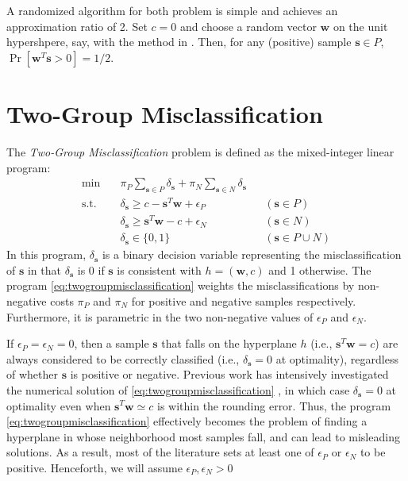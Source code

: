 \documentclass[11pt]{article}
\theoremstyle{definition}
\newcommand{\vect}[1]{\mathbf{#1}}
\newcommand{\sv}[1]{_{\vect{#1}}}
\begin{document}
A randomized algorithm for both problem is simple and achieves an approximation ratio of 2. 
Set $c = 0$ and choose a random vector $\vect{w}$ on the unit hypershpere, say, with the
method in \cite{rndvect}. Then, for any (positive) sample $\vect{s} \in P$,
$\Pr [ \vect{w}^T \vect{s} > 0 ] = 1 / 2$.

\section{Two-Group Misclassification}
The {\em Two-Group Misclassification\/} problem \cite{ClassificationOptSurvey}
is defined as the mixed-integer linear program: 
\begin{subequations}
\label{eq:twogroupmisclassification}
\begin{align}
\min\quad & 
\pi_P \sum_{\vect{s} \in P} \delta\sv{s} + 
\pi_N \sum_{\vect{s} \in N} \delta\sv{s} \\
\label{eq:tgmP}
\text{s.t.}\quad & 
\delta\sv{s} \geq c - \vect{s}^T \vect{w} + \epsilon_P & & (\vect{s} \in P) \\
\label{eq:tgmN}
& \delta\sv{s} \geq \vect{s}^T \vect{w} - c + \epsilon_N & & (\vect{s} \in N) \\
\label{eq:tgmbinary}
& \delta\sv{s} \in \{ 0, 1 \} & & (\vect{s} \in P \cup N) 
\end{align}
\end{subequations}
In this program, $\delta\sv{s}$ is a binary decision variable representing
the misclassification of $\vect{s}$ in that $\delta\sv{s}$ is 
0 if $\vect{s}$ is consistent with $h = (\vect{w}, c)$ and 
1 otherwise.
The program \eqref{eq:twogroupmisclassification} weights the misclassifications
by non-negative costs $\pi_P$ and $\pi_N$ 
for positive and negative samples respectively.
Furthermore, it is parametric in the two non-negative 
values of $\epsilon_P$ and $\epsilon_N$.

If $\epsilon_P = \epsilon_N = 0$, then a sample $\vect{s}$ that falls on the hyperplane $h$ (i.e., $\vect{s}^T \vect{w} = c$) are always considered to be correctly classified (i.e., $\delta\sv{s} = 0$ at optimality), regardless
of whether $\vect{s}$ is positive or negative.
Previous work has intensively investigated the numerical solution of 
\eqref{eq:twogroupmisclassification} \cite{ClassificationOptSurvey}, in which case 
$\delta\sv{s} = 0$ at optimality even when $\vect{s}^T \vect{w} \simeq c$
is within the rounding error. 
Thus, the program \eqref{eq:twogroupmisclassification} effectively
becomes the problem of finding
a hyperplane in whose neighborhood most samples fall, and can lead to 
misleading solutions. 
As a result, most of the literature sets at least one of $\epsilon_P$ or 
$\epsilon_N$ to be positive.
Henceforth, we will assume $\epsilon_P, \epsilon_N > 0$
\end{document}
